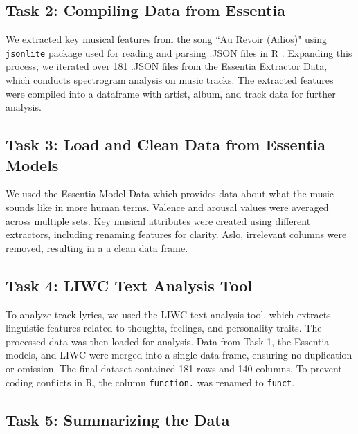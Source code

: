 \documentclass{article}\usepackage[]{graphicx}\usepackage[]{xcolor}
\begin{document}
\begin{multicols}{2}
\subsection{Task 2: Compiling Data from Essentia}
We extracted key musical features from the song ``Au Revoir (Adios)" using \texttt{jsonlite} package used for reading and parsing .JSON files in R \citep{Ooms}. Expanding this process, we iterated over 181 .JSON files from the Essentia Extractor Data, which conducts spectrogram analysis on music tracks\citep{Bogdanov}. The extracted features were compiled into a dataframe with artist, album, and track data for further analysis.

\subsection{Task 3: Load and Clean Data from Essentia Models}

We used the Essentia Model Data which provides data about what the music sounds like in more human terms. Valence and arousal values were averaged across multiple sets. Key musical attributes were created using different extractors, including renaming features for clarity. Aslo, irrelevant columns were removed, resulting in a a clean data frame.

\subsection{Task 4: LIWC Text Analysis Tool}
To analyze track lyrics, we used the LIWC text analysis tool, which extracts linguistic features related to thoughts, feelings, and personality traits. The processed data was then loaded for analysis. Data from Task 1, the Essentia models, and LIWC were merged into a single data frame, ensuring no duplication or omission. The final dataset contained 181 rows and 140 columns. To prevent coding conflicts in R, the column \texttt{function.} was renamed to \texttt{funct}. %


\subsection{Task 5: Summarizing the Data}


\end{multicols}
\end{document}
